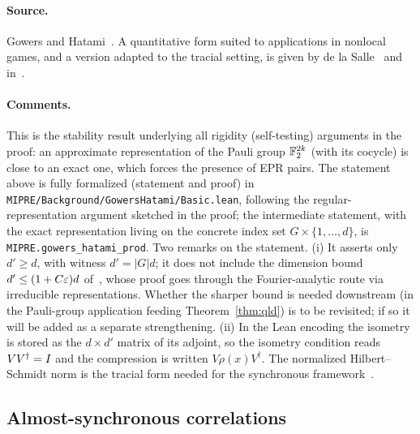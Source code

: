 \paragraph{Source.} Gowers and Hatami~\cite{GH17}. A quantitative form suited to
applications in nonlocal games, and a version adapted to the tracial setting, is given
by de la Salle~\cite{dlS21} and in~\cite{Vid22}.

\paragraph{Comments.} This is the stability result underlying all rigidity
(self-testing) arguments in the proof: an approximate representation of the Pauli group
$\mathbb{F}_2^{2k}$ (with its cocycle) is close to an exact one, which forces the presence of
EPR pairs. The statement above is fully formalized (statement and proof) in
\texttt{MIPRE/Background/GowersHatami/Basic.lean}, following the regular-representation
argument sketched in the proof; the intermediate statement, with the exact
representation living on the concrete index set $G \times \{1, \dots, d\}$, is
\texttt{MIPRE.gowers\_hatami\_prod}. Two remarks on the statement. (i) It asserts
only $d' \geq d$, with witness $d' = |G| d$; it does not include the dimension bound
$d' \leq (1 + C\varepsilon) d$ of~\cite{GH17}, whose proof goes through the Fourier-analytic
route via irreducible representations. Whether the sharper bound is needed downstream
(in the Pauli-group application feeding Theorem~\ref{thm:qld}) is to be revisited; if
so it will be added as a separate strengthening. (ii) In the Lean encoding the
isometry is stored as the $d \times d'$ matrix of its adjoint, so the isometry
condition reads $V V^\dagger = I$ and the compression is written
$V \rho(x) V^\dagger$. The normalized Hilbert--Schmidt norm is the tracial form
needed for the synchronous framework~\cite{dlS21,Vid22}.

\subsection{Almost-synchronous correlations}
\label{sec:rr-almost-sync}

\effortHard\ \qlib

